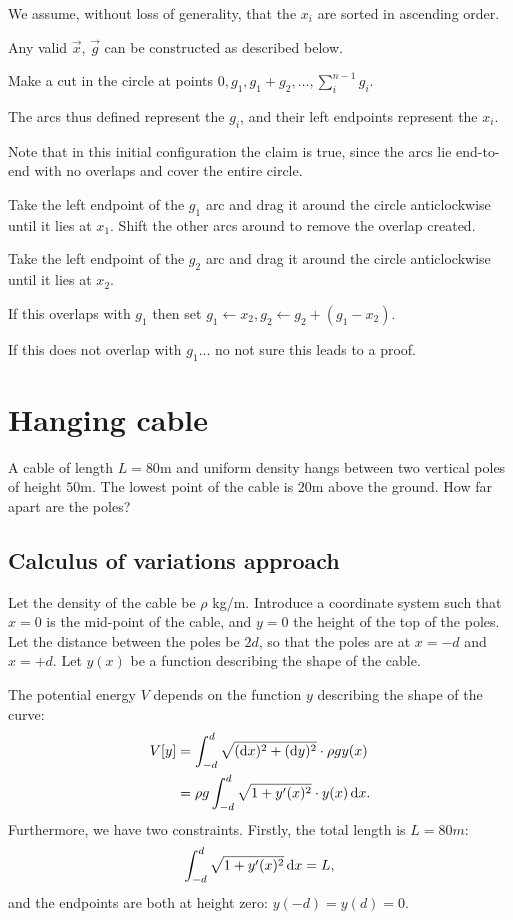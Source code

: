 \documentclass[12pt]{article}
\begin{document}
We assume, without loss of generality, that the $x_i$ are sorted in ascending order.

Any valid $\vec x$, $\vec g$ can be constructed as described below.

Make a cut in the circle at points $0, g_1, g_1 + g_2, \ldots, \sum_i^{n-1}g_i$.

The arcs thus defined represent the $g_i$, and their left endpoints represent the $x_i$.

Note that in this initial configuration the claim is true, since the arcs lie end-to-end with no
overlaps and cover the entire circle.

Take the left endpoint of the $g_1$ arc and drag it around the circle anticlockwise until it lies
at $x_1$. Shift the other arcs around to remove the overlap created.

Take the left endpoint of the $g_2$ arc and drag it around the circle anticlockwise until it lies
at $x_2$.

If this overlaps with $g_1$ then set $g_1 \leftarrow x_2, g_2 \leftarrow g_2 + (g_1 - x_2)$.

If this does not overlap with $g_1$... no not sure this leads to a proof.

\section{Hanging cable}

\begin{mdframed}
  A cable of length $L=80$m and uniform density hangs between two vertical poles of height
  $50$m. The lowest point of the cable is $20$m above the ground. How far apart are the poles?
\end{mdframed}

\subsection{Calculus of variations approach}

Let the density of the cable be $\rho$ kg/m. Introduce a coordinate system such that $x=0$ is the mid-point of
the cable, and $y = 0$ the height of the top of the poles. Let the distance between the poles be $2d$, so that
the poles are at $x = -d$ and $x = +d$. Let $y(x)$ be a function describing the shape of the cable.

The potential energy $V$ depends on the function $y$ describing the shape of the curve:
\begin{align*}
  V[y]
  &= \int_{-d}^d \sqrt{(\dx)^2 + (\dy)^2} \cdot \rho g y(x) \\
  &= \rho g \int_{-d}^d \sqrt{1 + y'(x)^2} \cdot y(x) \dx. \\
\end{align*}
Furthermore, we have two constraints. Firstly, the total length is $L = 80m$:
\begin{align*}
  \int_{-d}^d \sqrt{1 + y'(x)^2} \dx = L,
\end{align*}
and the endpoints are both at height zero: $y(-d) = y(d) = 0$.
\end{document}
